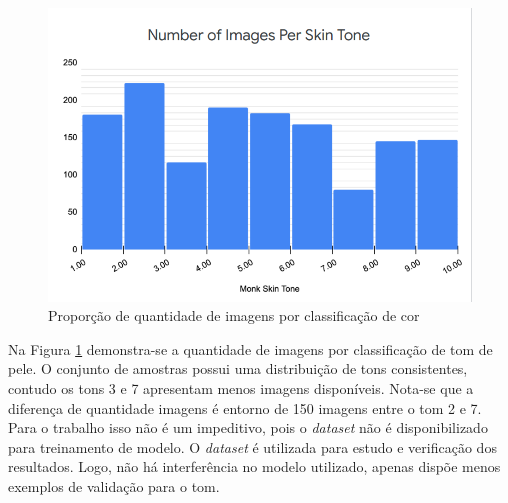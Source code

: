 \begin{figure}[h!]
\centering
\caption{Proporção de quantidade de imagens por classificação de cor}
\includegraphics[scale=0.9]{Template_Latex_TCC-UNIFTEC/_lib/imagens/MSTDataset.png}

\label{fig:x MST_Dataset}
\end{figure}

Na Figura \ref{fig:x MST_Dataset} demonstra-se a quantidade de imagens por classificação de tom de pele. O conjunto de amostras possui uma distribuição de tons consistentes, contudo os tons 3 e 7 apresentam menos imagens disponíveis. Nota-se que a diferença de quantidade imagens é entorno de 150 imagens entre o tom 2 e 7. Para o trabalho isso não é um impeditivo, pois o \textit{dataset} não é disponibilizado para treinamento de modelo. O \textit{dataset} é utilizada para estudo e verificação dos resultados. Logo, não há interferência no modelo utilizado, apenas dispõe menos exemplos de validação para o tom.


